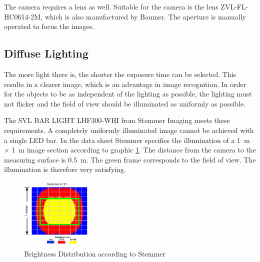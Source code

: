 The camera requires a lens as well.
Suitable for the camera is the lens ZVL-FL-HC0614-2M, which is also manufactured by Baumer.
The aperture is manually operated to focus the images.

\subsection{Diffuse Lighting}
\label{subsec:Lighting}
The more light there is, the shorter the exposure time can be selected.
This results in a clearer image, which is an advantage in image recognition.
In order for the objects to be as independent of the lighting as possible, the lighting must not flicker and the field of view should be illuminated as uniformly as possible.

The SVL BAR LIGHT LHF300-WHI from Stemmer Imaging meets these requirements.
A completely uniformly illuminated image cannot be achieved with a single LED bar.
In the data sheet Stemmer specifies the illumination of a \SI{1}{m} $\times$ \SI{1}{m} image section according to graphic \ref{fig:lighting_LEDBAR}.
The distance from the camera to the measuring surface is \SI{0.5}{m}.
The green frame corresponds to the field of view.
The illumination is therefore very satisfying.

\begin{figure}[h]
	\centering
	\includegraphics[width=0.3\textwidth]{graphics/brightness_level.pdf}
	\caption{Brightness Distribution according to Stemmer \cite{stemmer_datasheet}}
	\label{fig:lighting_LEDBAR}
\end{figure}